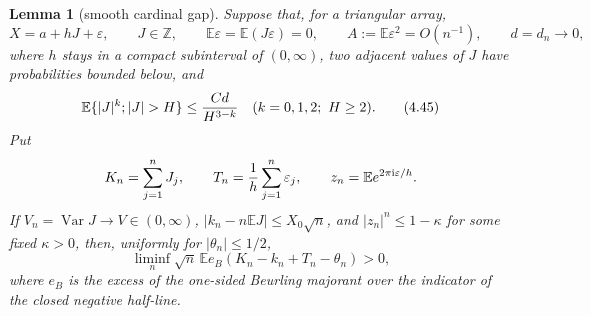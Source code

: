 \documentclass[11pt,a4paper]{article}
\numberwithin{equation}{section}
\newtheorem{lemma}[theorem]{Lemma}
\theoremstyle{definition}
\theoremstyle{remark}
\newcommand{\E}{\mathbb E}
\newcommand{\ii}{\mathrm i}
\begin{document}
\begin{lemma}[smooth cardinal gap]\label{orig:lem:cardgap}
Suppose that, for a triangular array,
\[
 X=a+hJ+\varepsilon,\qquad J\in\mathbb Z,\qquad
 \E\varepsilon=\E(J\varepsilon)=0,\qquad
 A:=\E\varepsilon^2=O(n^{-1}),\qquad d=d_n\to0,       \tag{4.44}
\]
where $h$ stays in a compact subinterval of $(0,\infty)$, two adjacent
values of $J$ have probabilities bounded below, and
\[
 \E\{|J|^k;|J|>H\}\le {Cd\over H^{3-k}}
 \quad(k=0,1,2;\ H\ge2).                               \tag{4.45}
\]
Put
\[
 K_n=\sum_{j=1}^nJ_j,\qquad
 T_n={1\over h}\sum_{j=1}^n\varepsilon_j,\qquad
 z_n=\E e^{2\pi\ii\varepsilon/h}.
\]
If $V_n=\operatorname {Var}J\to V\in(0,\infty)$,
$|k_n-n\E J|\le X_0\sqrt n$, and
$|z_n|^n\le1-\kappa$ for some fixed $\kappa>0$, then, uniformly for
$|\theta_n|\le1/2$,
\[
 \liminf_n\sqrt n\,
 \E e_B(K_n-k_n+T_n-\theta_n)>0,                       \tag{4.46}
\]
where $e_B$ is the excess of the one-sided Beurling majorant over the
indicator of the closed negative half-line.
\end{lemma}
\end{document}
